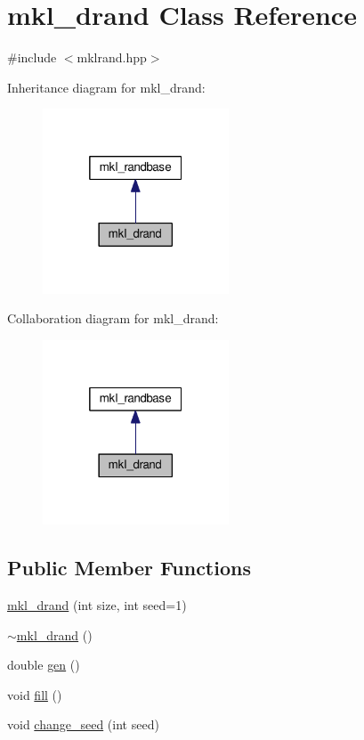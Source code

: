 \hypertarget{classmkl__drand}{}\section{mkl\+\_\+drand Class Reference}
\label{classmkl__drand}


{\ttfamily \#include $<$mklrand.\+hpp$>$}



Inheritance diagram for mkl\+\_\+drand\+:
\nopagebreak
\begin{figure}[H]
\begin{center}
\leavevmode
\includegraphics[width=157pt]{d1/df0/classmkl__drand__inherit__graph}
\end{center}
\end{figure}


Collaboration diagram for mkl\+\_\+drand\+:
\nopagebreak
\begin{figure}[H]
\begin{center}
\leavevmode
\includegraphics[width=157pt]{da/d86/classmkl__drand__coll__graph}
\end{center}
\end{figure}
\subsection*{Public Member Functions}
\begin{DoxyCompactItemize}
\item 
\hyperlink{classmkl__drand_a8c9e199ce976c9f8dc1e18732d02d76b}{mkl\+\_\+drand} (int size, int seed=1)
\item 
\hyperlink{classmkl__drand_aca7edf488f7096965b06d73e2c8cae61}{$\sim$mkl\+\_\+drand} ()
\item 
double \hyperlink{classmkl__drand_ade795ed0608db1de4b505bfa4b96903e}{gen} ()
\item 
void \hyperlink{classmkl__drand_ab736e571c6e90c3add23fa521ec00d6e}{fill} ()
\item 
void \hyperlink{classmkl__drand_a5f0495587fe751302639df8b620b5936}{change\+\_\+seed} (int seed)
\end{DoxyCompactItemize}
